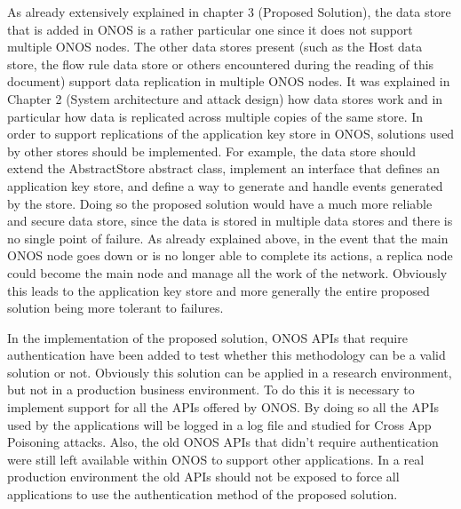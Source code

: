 {As already extensively explained in chapter 3 (Proposed Solution), the data store that is added in ONOS is a rather particular one since it does not support multiple ONOS nodes. The other data stores present (such as the Host data store, the flow rule data store or others encountered during the reading of this document) support data replication in multiple ONOS nodes. It was explained in Chapter 2 (System architecture and attack design) how data stores work and in particular how data is replicated across multiple copies of the same store. In order to support replications of the application key store in ONOS, solutions used by other stores should be implemented. For example, the data store should extend the AbstractStore abstract class, implement an interface that defines an application key store, and define a way to generate and handle events generated by the store. Doing so the proposed solution would have a much more reliable and secure data store, since the data is stored in multiple data stores and there is no single point of failure. As already explained above, in the event that the main ONOS node goes down or is no longer able to complete its actions, a replica node could become the main node and manage all the work of the network. Obviously this leads to the application key store and more generally the entire proposed solution being more tolerant to failures.
\medskip

In the implementation of the proposed solution, ONOS APIs that require authentication have been added to test whether this methodology can be a valid solution or not. Obviously this solution can be applied in a research environment, but not in a production business environment. To do this it is necessary to implement support for all the APIs offered by ONOS. By doing so all the APIs used by the applications will be logged in a log file and studied for Cross App Poisoning attacks. Also, the old ONOS APIs that didn't require authentication were still left available within ONOS to support other applications. In a real production environment the old APIs should not be exposed to force all applications to use the authentication method of the proposed solution.
\medskip 

}
